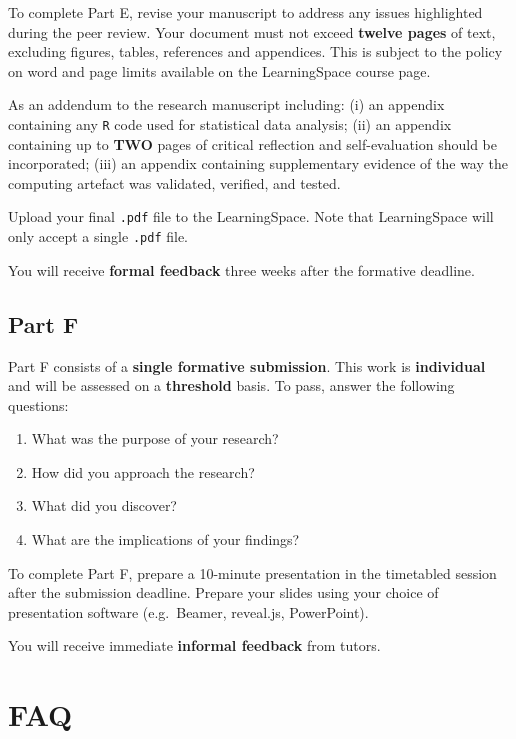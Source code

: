 To complete Part E, revise your manuscript to address any issues highlighted during the peer review.
Your document must not exceed \textbf{twelve pages} of text, excluding figures, tables, references and appendices.
This is subject to the policy on word and page limits available on the LearningSpace course page.

As an addendum to the research manuscript including: (i) an appendix containing any \texttt{R} code used for statistical data analysis; (ii) an appendix containing up to \textbf{TWO} pages of critical reflection and self-evaluation should be incorporated; (iii) an appendix containing supplementary evidence of the way the computing artefact was validated, verified, and tested.

Upload your final \texttt{.pdf} file to the LearningSpace.
Note that LearningSpace will only accept a single \texttt{.pdf} file.

You will receive \textbf{formal feedback} three weeks after the formative deadline.

\subsection*{Part F}

Part F consists of a \textbf{single formative submission}.
This work is \textbf{individual} and will be assessed on a \textbf{threshold} basis.
To pass, answer the following questions:

\begin{enumerate}[label=(\roman*)]
	\item What was the purpose of your research?
	\item How did you approach the research?
	\item What did you discover?
	\item What are the implications of your findings?
\end{enumerate}

To complete Part F, prepare a 10-minute presentation in the timetabled session after the submission deadline.
Prepare your slides using your choice of presentation software (e.g.\ Beamer, reveal.js, PowerPoint).

You will receive immediate \textbf{informal feedback} from tutors.

\section*{FAQ}

